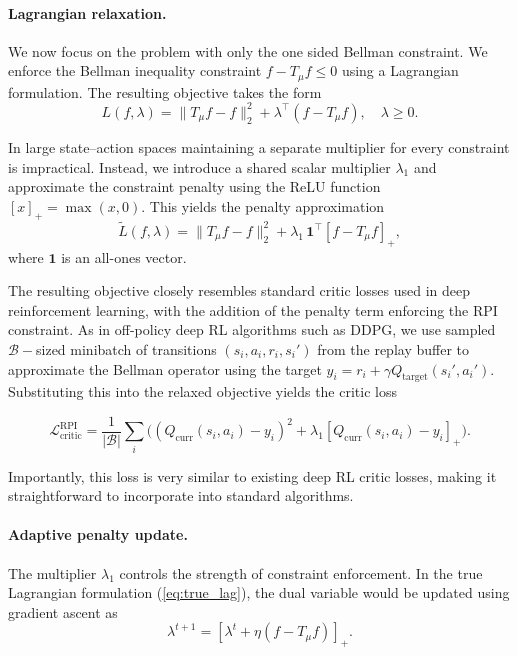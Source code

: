 \documentclass[twoside]{article}
\theoremstyle{plain}
\theoremstyle{definition}
\theoremstyle{remark}
\renewcommand{\eqref}[1]{(\ref{#1})}
\begin{document}

\paragraph{Lagrangian relaxation.}
We now focus on the problem with only the one sided Bellman constraint. We enforce the Bellman inequality constraint $f - T_\mu f \le 0$ using a Lagrangian formulation. The resulting objective takes the form
\begin{equation}
\label{eq:true_lag}
L(f,\lambda)
=
\|T_\mu f - f\|^2_2
+
\lambda^\top (f - T_\mu f),
\quad
\lambda \ge 0.
\end{equation}

In large state–action spaces maintaining a separate multiplier for every constraint is impractical. Instead, we introduce a shared scalar multiplier $\lambda_1$ and approximate the constraint penalty using the ReLU function $[x]_+ = \max(x,0)$. This yields the penalty approximation
\[
\tilde{L}(f,\lambda)
=
\|T_\mu f - f\|^2_2
+
\lambda_1 \, \mathbf{1}^\top
[f - T_\mu f]_+ ,
\]
where $\mathbf{1}$ is an all-ones vector.

The resulting objective closely resembles standard critic losses used in deep reinforcement learning, with the addition of the penalty term enforcing the RPI constraint. As in off-policy deep RL algorithms such as DDPG, we use sampled $\mathcal{B}-$sized minibatch of transitions $(s_i,a_i,r_i,s_i')$ from the replay buffer to approximate the Bellman operator using the target $y_i = r_i + \gamma Q_{\text{target}}(s_i',a_i').$ Substituting this into the relaxed objective yields the critic loss

\[
\mathcal L^{\text{RPI}}_{\text{critic}}
=
\frac{1}{|\mathcal B|}
\sum_i
\Big(
(Q_{\text{curr}}(s_i,a_i) - y_i)^2
+
\lambda_1 [Q_{\text{curr}}(s_i,a_i) - y_i]_+
\Big).
\]

Importantly, this loss
is very similar to existing deep RL critic losses, making it straightforward
to incorporate into standard algorithms.

\paragraph{Adaptive penalty update.}

The multiplier $\lambda_1$ controls the strength of constraint enforcement.
In the true Lagrangian formulation \eqref{eq:true_lag}, the dual variable would be updated using
gradient ascent as
\[
\lambda^{t+1} =
\left[\lambda^t + \eta (f - T_\mu f)\right]_+ .
\]
\end{document}
